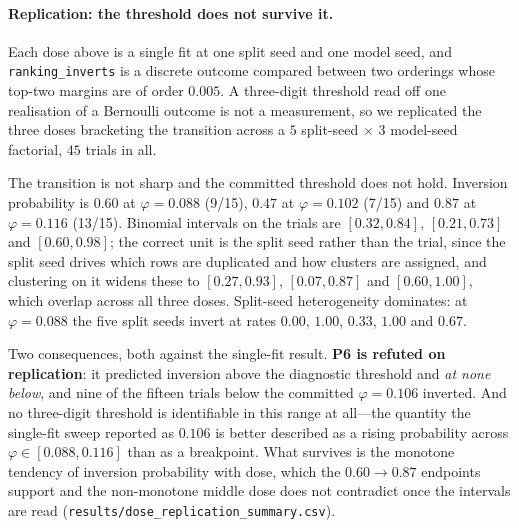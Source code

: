 \documentclass[11pt,a4paper]{article}
\begin{document}
\paragraph{Replication: the threshold does not survive it.} Each dose above is a single fit at one
split seed and one model seed, and \texttt{ranking\_inverts} is a discrete outcome compared between
two orderings whose top-two margins are of order $0.005$. A three-digit threshold read off one
realisation of a Bernoulli outcome is not a measurement, so we replicated the three doses bracketing
the transition across a $5$ split-seed $\times$ $3$ model-seed factorial, $45$ trials in all.

The transition is not sharp and the committed threshold does not hold. Inversion probability is
$0.60$ at $\varphi=0.088$ (9/15), $0.47$ at $\varphi=0.102$ (7/15) and $0.87$ at $\varphi=0.116$
(13/15). Binomial intervals on the trials are $[0.32,0.84]$, $[0.21,0.73]$ and $[0.60,0.98]$; the
correct unit is the split seed rather than the trial, since the split seed drives which rows are
duplicated and how clusters are assigned, and clustering on it widens these to $[0.27,0.93]$,
$[0.07,0.87]$ and $[0.60,1.00]$, which overlap across all three doses. Split-seed heterogeneity
dominates: at $\varphi=0.088$ the five split seeds invert at rates $0.00$, $1.00$, $0.33$, $1.00$ and
$0.67$.

Two consequences, both against the single-fit result. \textbf{P6 is refuted on replication}: it
predicted inversion above the diagnostic threshold and \emph{at none below}, and nine of the fifteen
trials below the committed $\varphi=0.106$ inverted. And no three-digit threshold is identifiable in
this range at all---the quantity the single-fit sweep reported as $0.106$ is better described as a
rising probability across $\varphi\in[0.088,0.116]$ than as a breakpoint. What survives is the
monotone tendency of inversion probability with dose, which the $0.60\to0.87$ endpoints support and
the non-monotone middle dose does not contradict once the intervals are read
(\texttt{results/dose\_replication\_summary.csv}).
\end{document}
